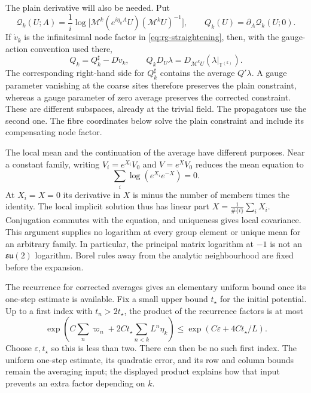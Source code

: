 \documentclass[11pt,letterpaper,reqno]{amsart}
\theoremstyle{definition}
\theoremstyle{remark}
\begin{document}
The plain derivative will also be needed. Put
\[
 \mathcal Q_k(U;A)=\frac1i\log\big[
       \mathcal M^k(e^{i\eta_kA}U)(\mathcal M^kU)^{-1}\big],
 \qquad Q_k(U)=\partial_A\mathcal Q_k(U;0).
\]
If $\dot v_k$ is the infinitesimal node factor in
\eqref{eq:rg-straightening}, then, with the gauge-action convention
used there,
\begin{equation}\label{eq:mrg-plain-corrected}
 Q_k=Q_k^\sharp-D\dot v_k,
 \qquad
 Q_kD_U\lambda=D_{\mathcal M^kU}
                 (\lambda|_{\mathbb T^{(k)}}).
\end{equation}
The corresponding right-hand side for $Q_k^\sharp$ contains the
average $Q'\lambda$. A gauge parameter vanishing at the coarse
sites therefore preserves the plain constraint, whereas a gauge
parameter of zero average preserves the corrected constraint. These
are different subspaces, already at the trivial field. The
propagators use the second one. The fibre coordinates below solve the
plain constraint and include its compensating node factor.

The local mean and the continuation of the average have different
purposes. Near a constant family, writing $V_i=e^{X_i}V_0$ and
$V=e^XV_0$ reduces the mean equation to
\[
 \sum_i\log(e^{X_i}e^{-X})=0.
\]
At $X_i=X=0$ its derivative in $X$ is minus the number of members
times the identity. The local implicit solution thus has linear
part $X=\frac1{\#\{i\}}\sum_iX_i$. Conjugation commutes with
the equation, and uniqueness gives local covariance. This argument
supplies no logarithm at every group element or unique mean for an
arbitrary family. In particular, the principal matrix logarithm at
$-1$ is not an $\mathfrak{su}(2)$ logarithm. Borel rules away from
the analytic neighbourhood are fixed before the expansion.

The recurrence for corrected averages gives an elementary uniform
bound once its one-step estimate is available. Fix a small upper
bound $t_\star$ for the initial potential. Up to a first index with
$t_n>2t_\star$, the product of the recurrence factors is at most
\[
 \exp\!\left(C\sum_n\varpi_n+
           2Ct_\star\sum_{n<k}L^n\eta_k\right)
 \le\exp(C\varepsilon+4Ct_\star/L).
\]
Choose $\varepsilon,t_\star$ so this is less than two. There can
then be no such first index. The uniform one-step estimate, its
quadratic error, and its row and column bounds remain the averaging
input; the displayed product explains how that input prevents an
extra factor depending on $k$.
\end{document}
